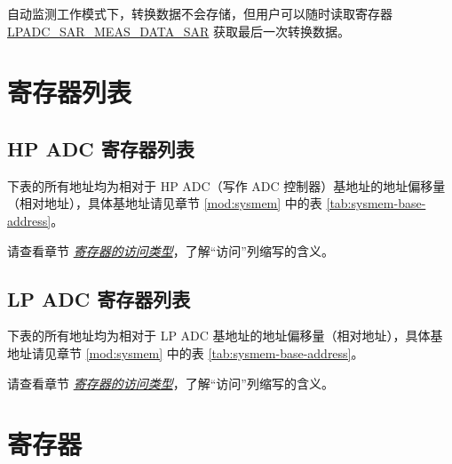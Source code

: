 \documentclass[main\_\_CN.tex]{subfiles}
\begin{document}
自动监测工作模式下，转换数据不会存储，但用户可以随时读取寄存器 \hyperref[fielddesc:LPADCMEAS1DATASAR]{LPADC\_SAR\_MEAS\_DATA\_SAR} 获取最后一次转换数据。




\newpage
\hypertarget{adc-reg-summ}{}
\section{寄存器列表}
\label{sec:adc-reg-summ}
\subsection{HP ADC 寄存器列表}

下表的所有地址均为相对于 HP ADC（写作 ADC 控制器）基地址的地址偏移量（相对地址），具体基地址请见章节 \ref{mod:sysmem} \textit{} 中的表 \ref{tab:sysmem-base-address}。

请查看章节 \hyperref[glossary-access-types]{\textit{寄存器的访问类型}}，了解“访问”列缩写的含义。



\subsection{LP ADC 寄存器列表}

下表的所有地址均为相对于 LP ADC 基地址的地址偏移量（相对地址），具体基地址请见章节 \ref{mod:sysmem} \textit{} 中的表 \ref{tab:sysmem-base-address}。

请查看章节 \hyperref[glossary-access-types]{\textit{寄存器的访问类型}}，了解“访问”列缩写的含义。





\newpage
\section{寄存器}
\end{document}
